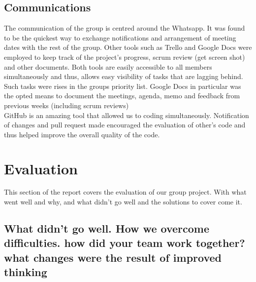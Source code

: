 \documentclass{article} \usepackage{graphicx}
\begin{document}
		\subsection{Communications}
			The communication of the group is centred around the Whatsapp. It was found to be the quickest way to exchange notifications and arrangement of meeting dates with the rest of the group. Other tools such as Trello and Google Docs were employed to keep track of the project's progress, scrum review (get screen shot) and other documents. Both tools are easily accessible to all members simultaneously and thus, allows easy visibility of tasks that are lagging behind. Such tasks were rises in the groups priority list. Google Docs in particular was the opted means to document the meetings, agenda, memo and feedback from previous weeks (including scrum reviews)\\
			
			GitHub is an amazing tool that allowed us to coding simultaneously. Notification of changes and pull request made encouraged the evaluation of other's code and thus helped improve the overall quality of the code.
	\section{Evaluation}
	This section of the report covers the evaluation of our group project.  With what went well and why, and what didn't go well and the solutions to cover come it.
	
			\subsection{What didn't go well. How we overcome difficulties. how did your team work together? what changes were the result of improved thinking }
			
\end{document}
